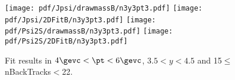 \begin{figure}[H]
\begin{center}
\texttt{[image: pdf/Jpsi/drawmassB/n3y3pt3.pdf]}
\texttt{[image: pdf/Jpsi/2DFitB/n3y3pt3.pdf]}
\vspace*{-0.5cm}
\texttt{[image: pdf/Psi2S/drawmassB/n3y3pt3.pdf]}
\texttt{[image: pdf/Psi2S/2DFitB/n3y3pt3.pdf]}
\vspace*{-0.5cm}
\end{center}
\caption{Fit results in $4\gevc<\pt<6\gevc$, $3.5<y<4.5$ and 15$\leq$nBackTracks$<$22.}
\label{Fitn3y3pt3}
\end{figure}

